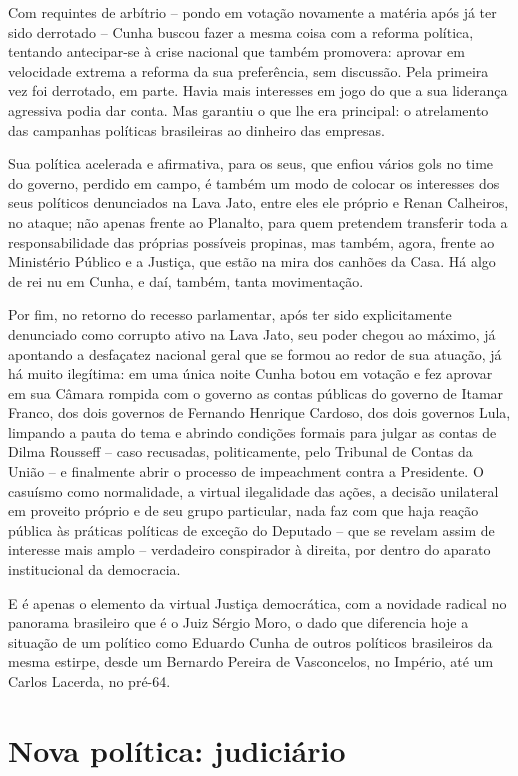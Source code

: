Com requintes de arbítrio -- pondo em votação novamente a matéria após
já ter sido derrotado -- Cunha buscou fazer a mesma coisa com a reforma
política, tentando antecipar-se à crise nacional que também promovera:
aprovar em velocidade extrema a reforma da sua preferência, sem
discussão. Pela primeira vez foi derrotado, em parte. Havia mais
interesses em jogo do que a sua liderança agressiva podia dar conta. Mas
garantiu o que lhe era principal: o atrelamento das campanhas políticas
brasileiras ao dinheiro das empresas.

Sua política acelerada e afirmativa, para os seus, que enfiou vários
gols no time do governo, perdido em campo, é também um modo de colocar os
interesses dos seus políticos denunciados na Lava Jato, entre eles ele
próprio e Renan Calheiros, no ataque; não apenas frente ao Planalto,
para quem pretendem transferir toda a responsabilidade das próprias
possíveis propinas, mas também, agora, frente ao Ministério Público e a
Justiça, que estão na mira dos canhões da Casa. Há algo de rei nu em
Cunha, e daí, também, tanta movimentação.

Por fim, no retorno do recesso parlamentar, após ter sido explicitamente
denunciado como corrupto ativo na Lava Jato, seu poder chegou ao máximo,
já apontando a desfaçatez nacional geral que se formou ao redor de sua
atuação, já há muito ilegítima: em uma única noite Cunha botou em
votação e fez aprovar em sua Câmara rompida com o governo as contas
públicas do governo de Itamar Franco, dos dois governos de Fernando
Henrique Cardoso, dos dois governos Lula, limpando a pauta do tema e
abrindo condições formais para julgar as contas de Dilma Rousseff --
caso recusadas, politicamente, pelo Tribunal de Contas da União -- e
finalmente abrir o processo de impeachment contra a Presidente. O
casuísmo como normalidade, a virtual ilegalidade das ações, a decisão
unilateral em proveito próprio e de seu grupo particular, nada faz com
que haja reação pública às práticas políticas de exceção do Deputado --
que se revelam assim de interesse mais amplo -- verdadeiro conspirador à
direita, por dentro do aparato institucional da democracia.

E é apenas o elemento da virtual Justiça democrática, com a novidade
radical no panorama brasileiro que é o Juiz Sérgio Moro, o dado que
diferencia hoje a situação de um político como Eduardo Cunha de outros
políticos brasileiros da mesma estirpe, desde um Bernardo Pereira de
Vasconcelos, no Império, até um Carlos Lacerda, no pré-64.

  \section{Nova política:
  judiciário}\label{nova-poluxedtica-judiciuxe1rio}

